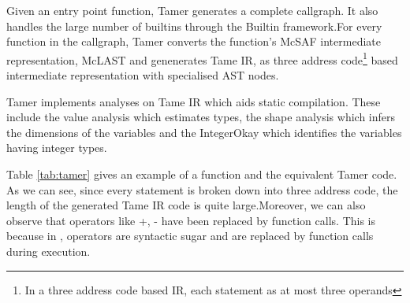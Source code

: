 Given an entry point function, Tamer generates a complete callgraph. It also handles the large number of \matlab builtins through the Builtin framework.For every function in the callgraph, Tamer converts the function's McSAF intermediate representation, McLAST and genenerates Tame IR, as three address code\footnote{In a three address code based IR, each statement as at most three operands} based intermediate representation with specialised AST nodes. 

Tamer implements analyses on Tame IR which aids static compilation. These include the value analysis which estimates \matlab types, the shape analysis\cite{Li:2014} which infers the dimensions of the variables and the IntegerOkay\cite{vkumar14} which identifies the variables having integer types. 

Table \ref{tab:tamer} gives an example of a \matlab function and the equivalent Tamer code. As we can see, since every statement is broken down into three address code, the length of the generated Tame IR code is quite large.Moreover, we can also observe that operators like \textsf{+}, \textsf{-} have been replaced by function calls. This is because in \matlab, operators are syntactic sugar and are replaced by function calls during execution. 


